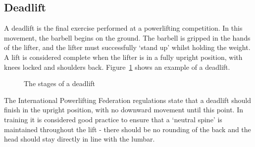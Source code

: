 \subsection{Deadlift}

A deadlift is the final exercise performed at a powerlifting competition. In this movement, the barbell begins on the ground. The barbell is gripped in the hands of the lifter, and the lifter must successfully `stand up' whilst holding the weight. A lift is considered complete when the lifter is in a fully upright position, with knees locked and shoulders back. Figure~\ref{fig:dead_stages} shows an example of a deadlift.

\begin{figure}[H]
    \centering
\caption{The stages of a deadlift}
\label{fig:dead_stages}
\end{figure}

The International Powerlifting Federation regulations\cite{ipf} state that a deadlift should finish in the upright position, with no downward movement until this point. In training it is considered good practice to ensure that a `neutral spine' is maintained throughout the lift - there should be no rounding of the back and the head should stay directly in line with the lumbar.
